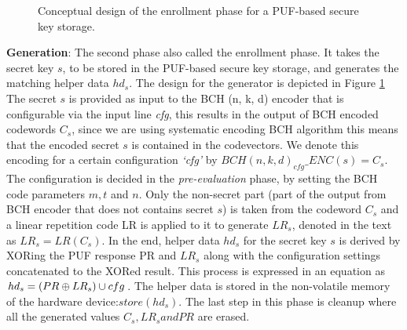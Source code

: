 \begin{figure}[htp]
\centering
{}
\caption{Conceptual design of the enrollment phase for a PUF-based secure key storage.}
\label{img:fz_2}
\end{figure}

\textbf{Generation}: The second phase also called the enrollment phase. It takes the secret key $s$, to be stored in the PUF-based secure key storage, and generates the matching helper data $hd_s$. The design for the generator is depicted in Figure \ref{img:fz_2}  The secret $s$ is provided as input to the BCH (n, k, d) encoder that is configurable via the input line \emph{cfg}, this results in the output of BCH encoded codewords $C_s$, since we are using systematic encoding BCH algorithm this means that
the encoded secret $s$ is contained in the codevectors. We denote this encoding for a certain configuration \emph{`cfg'} by $BCH(n,k,d)_{cfg}\_ENC(s) = C_s$. The configuration is decided in the \emph{pre-evaluation} phase, by setting the BCH code parameters $m, t$ and $n$.
Only the non-secret part (part of the output from BCH encoder that does not contains secret $s$) is taken from the codeword $C_s$ and a linear repetition code LR is applied to it to generate $LR_s$, denoted in the text as $LR_s = LR(C_s)$. In the end, helper data $hd_s$ for the secret key $s$ is derived by XORing the PUF response PR and $LR_s$ along with the configuration settings concatenated to the XORed result. This process is expressed in an equation as $hd_s = (PR \mathbin{\oplus} LR_s) \cup cfg$.
The helper data is stored in the non-volatile memory of the hardware device:$store(hd_s)$. The last step in this phase is cleanup where all the generated values $C_s, LR_s and PR$ are erased.\\

